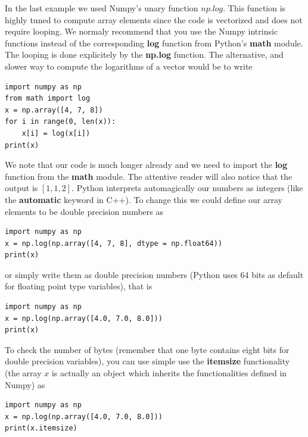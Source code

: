 \documentclass{beamer}
\begin{document}
\begin{frame}
In the last example we used Numpy's unary function $np.log$. This function is
highly tuned to compute array elements since the code is vectorized
and does not require looping. We normaly recommend that you use the
Numpy intrinsic functions instead of the corresponding \textbf{log} function
from Python's \textbf{math} module. The looping is done explicitely by the
\textbf{np.log} function. The alternative, and slower way to compute the
logarithms of a vector would be to write








\begin{verbatim}
import numpy as np
from math import log
x = np.array([4, 7, 8])
for i in range(0, len(x)):
    x[i] = log(x[i])
print(x)

\end{verbatim}

We note that our code is much longer already and we need to import the \textbf{log} function from the \textbf{math} module. 
The attentive reader will also notice that the output is $[1, 1, 2]$. Python interprets automagically our numbers as integers (like the \textbf{automatic} keyword in C++). To change this we could define our array elements to be double precision numbers as




\begin{verbatim}
import numpy as np
x = np.log(np.array([4, 7, 8], dtype = np.float64))
print(x)

\end{verbatim}

or simply write them as double precision numbers (Python uses 64 bits as default for floating point type variables), that is




\begin{verbatim}
import numpy as np
x = np.log(np.array([4.0, 7.0, 8.0]))
print(x)

\end{verbatim}

To check the number of bytes (remember that one byte contains eight bits for double precision variables), you can use simple use the \textbf{itemsize} functionality (the array $x$ is actually an object which inherits the functionalities defined in Numpy) as 




\begin{verbatim}
import numpy as np
x = np.log(np.array([4.0, 7.0, 8.0]))
print(x.itemsize)

\end{verbatim}
\end{frame}
\end{document}
